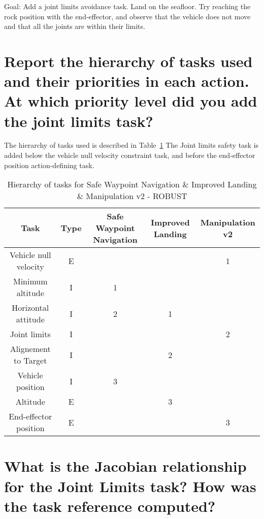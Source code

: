 	Goal: Add a joint limits avoidance task. Land on the seafloor. Try reaching the
	rock position with the end-effector, and observe that the vehicle does not move
	and that all the joints are within their limits.
	\begin{parts}
		\part{Report the hierarchy of tasks used and their priorities in
		each action. At which priority level did you add the joint limits task?}

		\begin{solutionorbox}
			The hierarchy of tasks used is described in
			Table~\ref{table:tkip_swn_improved_landing_manipulation_v2_robust}
			The Joint limits safety task is added below
			the vehicle null velocity constraint task, and before
			the end-effector position action-defining task.
		\end{solutionorbox}
		\begin{table}[htb] 
			\caption{Hierarchy of tasks for Safe Waypoint Navigation
				\& Improved Landing \& Manipulation v2 - ROBUST}
			\label{table:tkip_swn_improved_landing_manipulation_v2_robust}
			\begin{center}
				\footnotesize
				\begin{tabular}{ccccc}
					\toprule Task & Type &
					Safe Waypoint Navigation & Improved
					Landing & Manipulation v2\\
					\midrule Vehicle null velocity & E & & & 1\\
					\hdashline Minimum altitude & I & 1 & &\\
					\hdashline Horizontal attitude & I & 2 & 1& \\
					\hdashline Joint limits & I & & & 2\\
					\hdashline Alignement to Target & I & & 2&\\
					\hdashline Vehicle position & I & 3 & &\\
					\hdashline Altitude & E &  & 3& \\
					\hdashline End-effector position & E & & & 3\\
					\bottomrule
				\end{tabular}%
			\end{center}%
		\end{table}%
		\part{What is the Jacobian relationship for the Joint Limits task?
		How was the task reference computed?}


\end{parts}
